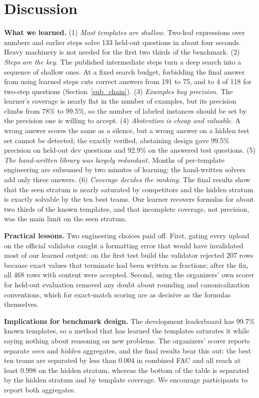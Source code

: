 \documentclass[conference]{IEEEtran}
\begin{document}
\section{Discussion}
\textbf{What we learned.}
(1) \emph{Most templates are shallow.} Two-leaf expressions over numbers and
earlier steps solve 133 held-out questions in about four seconds. Heavy
machinery is not needed for the first two thirds of the benchmark.
(2) \emph{Steps are the key.} The published intermediate steps turn a deep
search into a sequence of shallow ones. At a fixed search budget, forbidding the
final answer from using learned steps cuts correct answers from 191 to 75, and
to 4 of 118 for two-step questions (Section~\ref{sub_chain}).
(3) \emph{Examples buy precision.} The learner's coverage is nearly flat in the
number of examples, but its precision climbs from 78\% to 99.5\%, so the number
of labeled instances should be set by the precision one is willing to accept.
(4) \emph{Abstention is cheap and valuable.} A wrong answer scores the same as a
silence, but a wrong answer on a hidden test set cannot be detected; the
exactly verified, abstaining design gave 99.5\% precision on held-out dev
questions and 92.9\% on the answered test questions.
(5) \emph{The hand-written library was largely redundant.} Months of per-template
engineering are subsumed by two minutes of learning; the hand-written
solvers add only three answers.
(6) \emph{Coverage decides the ranking.} The final results show that the seen
stratum is nearly saturated by competitors and the hidden stratum is exactly
solvable by the ten best teams. Our learner recovers formulas for about two
thirds of the known templates, and that incomplete coverage, not precision, was
the main limit on the seen stratum.

\textbf{Practical lessons.} Two engineering choices paid off. First,
gating every upload on the official validator caught a formatting error that
would have invalidated most of our learned output: on the first test build the
validator rejected 207 rows because exact values that terminate had been written
as fractions; after the fix, all 468 rows with content were accepted. Second,
using the organizers' own scorer for held-out evaluation removed any doubt about
rounding and canonicalization conventions, which for exact-match scoring are as
decisive as the formulas themselves.

\textbf{Implications for benchmark design.} The development leaderboard has
99.7\% known templates, so a method that has learned the templates saturates it
while saying nothing about reasoning on new problems. The organizers' scorer
reports separate \emph{seen} and \emph{hidden} aggregates, and the final results
bear this out: the best ten teams are separated by less than 0.004 in combined
FAC and all reach at least 0.998 on the hidden stratum, whereas the bottom of
the table is separated by the hidden stratum and by template coverage. We
encourage participants to report both aggregates.
\end{document}
